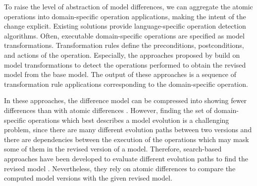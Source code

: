To raise the level of abstraction of model differences, we can aggregate the atomic operations into domain-specific operation applications, making the intent of the change explicit.
Existing solutions  provide language-specific operation detection algorithms.
Often, executable domain-specific operations are specified as model transformations.
Transformation rules define the preconditions, postconditions, and actions of the operation.
Especially, the approaches  proposed by  build on model transformations to detect the operations performed to obtain the revised model from the base model.
The output of these approaches is a sequence of transformation rule applications corresponding to the domain-specific operation.

In these approaches, the difference model can be compressed into showing fewer differences than with atomic differences .
However, finding the set of domain-specific operations which best describes a model evolution is a challenging problem, since there are many different evolution paths between two versions and there are dependencies between the execution of the operations which may mask some of them in the revised version of a model.
Therefore, search-based approaches have been developed to evaluate different evolution paths to find the revised model .
Nevertheless, they rely on atomic differences to compare the computed model versions with the given revised model. 

%

